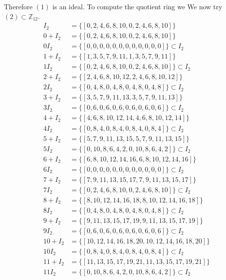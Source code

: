 \documentclass[11pt]{amsart}
\begin{document}
Therefore $(1)$ is an ideal.
To compute the quotient ring we
We now try $(2) \subset \mathbb{Z}_{12}$.
\begin{equation*}
\begin{aligned}
I_2 &= \{[0, 2, 4, 6, 8, 10, 0, 2, 4, 6, 8, 10]\} \\
0+ I_2 &= \{[0, 2, 4, 6, 8, 10, 0, 2, 4, 6, 8, 10]\}\\
0 I_2 &= \{[0, 0, 0, 0, 0, 0, 0, 0, 0, 0, 0, 0]\} \subset I_2 \\
1+ I_2 &= \{[1, 3, 5, 7, 9, 11, 1, 3, 5, 7, 9, 11]\}\\
1 I_2 &= \{[0, 2, 4, 6, 8, 10, 0, 2, 4, 6, 8, 10]\} \subset I_2 \\
2+ I_2 &= \{[2, 4, 6, 8, 10, 12, 2, 4, 6, 8, 10, 12]\}\\
2 I_2 &= \{[0, 4, 8, 0, 4, 8, 0, 4, 8, 0, 4, 8]\} \subset I_2 \\
3+ I_2 &= \{[3, 5, 7, 9, 11, 13, 3, 5, 7, 9, 11, 13]\}\\
3 I_2 &= \{[0, 6, 0, 6, 0, 6, 0, 6, 0, 6, 0, 6]\} \subset I_2 \\
4+ I_2 &= \{[4, 6, 8, 10, 12, 14, 4, 6, 8, 10, 12, 14]\}\\
4 I_2 &= \{[0, 8, 4, 0, 8, 4, 0, 8, 4, 0, 8, 4]\} \subset I_2 \\
5+ I_2 &= \{[5, 7, 9, 11, 13, 15, 5, 7, 9, 11, 13, 15]\}\\
5 I_2 &= \{[0, 10, 8, 6, 4, 2, 0, 10, 8, 6, 4, 2]\} \subset I_2 \\
6+ I_2 &= \{[6, 8, 10, 12, 14, 16, 6, 8, 10, 12, 14, 16]\}\\
6 I_2 &= \{[0, 0, 0, 0, 0, 0, 0, 0, 0, 0, 0, 0]\} \subset I_2 \\
7+ I_2 &= \{[7, 9, 11, 13, 15, 17, 7, 9, 11, 13, 15, 17]\}\\
7 I_2 &= \{[0, 2, 4, 6, 8, 10, 0, 2, 4, 6, 8, 10]\} \subset I_2 \\
8+ I_2 &= \{[8, 10, 12, 14, 16, 18, 8, 10, 12, 14, 16, 18]\}\\
8 I_2 &= \{[0, 4, 8, 0, 4, 8, 0, 4, 8, 0, 4, 8]\} \subset I_2 \\
9+ I_2 &= \{[9, 11, 13, 15, 17, 19, 9, 11, 13, 15, 17, 19]\}\\
9 I_2 &= \{[0, 6, 0, 6, 0, 6, 0, 6, 0, 6, 0, 6]\} \subset I_2 \\
10+ I_2 &= \{[10, 12, 14, 16, 18, 20, 10, 12, 14, 16, 18, 20]\}\\
10 I_2 &= \{[0, 8, 4, 0, 8, 4, 0, 8, 4, 0, 8, 4]\} \subset I_2 \\
11+ I_2 &= \{[11, 13, 15, 17, 19, 21, 11, 13, 15, 17, 19, 21]\}\\
11 I_2 &= \{[0, 10, 8, 6, 4, 2, 0, 10, 8, 6, 4, 2]\} \subset I_2 \\
\end{aligned}
\end{equation*}
\end{document}
